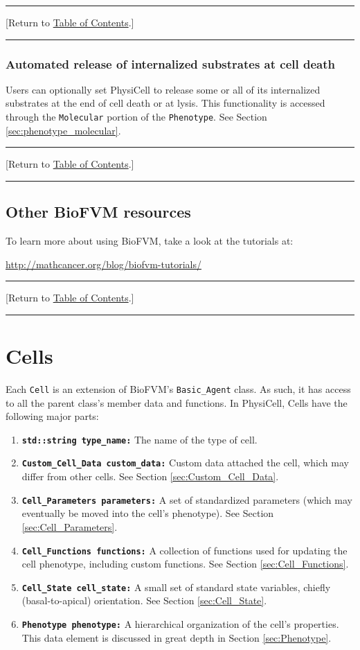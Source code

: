 \documentclass[12pt]{article}
\renewcommand{\v}{\verb}
\newcommand{\smallcode}[1]{\textbf{\texttt{#1}}}
\newcommand{\blue}[1]{\textcolor{blue}{#1}}
\newcommand{\DONE}{}%
\newcommand{\TOClink}{\begin{center}\hrule\vskip-5pt\phantom{.}\hfill[Return to \hyperlink{TOC}{Table of Contents}.]\hfill\phantom{.}\vskip3pt\hrule\end{center}}
\begin{document}
\TOClink

\subsubsection{Automated release of internalized substrates at cell death}
\label{sec:BioFVM_auto_release_at_death}

Users can optionally set PhysiCell to release some or all of its internalized substrates at the end of 
cell death or at lysis. This functionality is accessed through the \v|Molecular| portion of the 
\v|Phenotype|. See Section \ref{sec:phenotype_molecular}. 

\TOClink 

\subsection{Other BioFVM resources}
\label{sec:BioFVM_further_reading}
To learn more about using BioFVM, take a look at the tutorials at: 

\href{http://mathcancer.org/blog/biofvm-tutorials/}{http://mathcancer.org/blog/biofvm-tutorials/}

\TOClink

\section{Cells \DONE} 
\label{sec:Cells}
Each \v|Cell| is an extension of BioFVM's \v|Basic_Agent| class. As such, 
it has access to all the parent class's member data and functions. In PhysiCell, 
Cells have the following major parts: 

\begin{enumerate}
\item 
\smallcode{std::string type\_name:} The name of the type of cell. 
\item 
\smallcode{Custom\_Cell\_Data custom\_data:} Custom data attached the cell, which may 
differ from other cells. See Section \ref{sec:Custom_Cell_Data}. 

\item 
\smallcode{Cell\_Parameters parameters:} A set of standardized parameters 
(which may eventually be moved into the cell's phenotype). See 
Section \ref{sec:Cell_Parameters}. 

\item 
\smallcode{Cell\_Functions functions:} A collection of functions used for 
updating the cell phenotype, including custom functions. 
See Section \ref{sec:Cell_Functions}. 

\item 
\smallcode{Cell\_State cell\_state:} A small set of standard state variables,
chiefly (basal-to-apical) orientation. See Section 
\ref{sec:Cell_State}. 

\item 
\smallcode{Phenotype phenotype:} A hierarchical organization of the cell's 
properties. This data element is discussed in great depth 
in Section \ref{sec:Phenotype}.  
\end{enumerate} 
\end{document}
